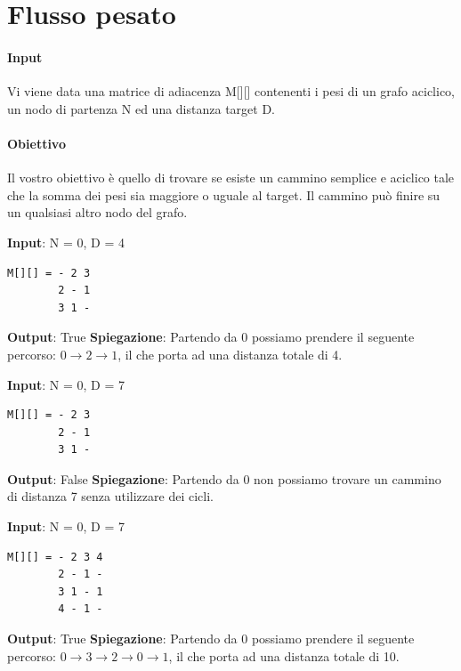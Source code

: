 \setlength{\parskip}{0pt}
\titlespacing*{\subparagraph}{1em}{0em}{0em} 

\thispagestyle{chapterInit}
\section*{Flusso pesato}
    \paragraph{Input} Vi viene data una matrice di adiacenza M[][] contenenti i pesi di un grafo aciclico, un nodo di partenza N ed una distanza target D.
    \paragraph{Obiettivo} Il vostro obiettivo è quello di trovare se esiste un cammino semplice e aciclico tale che la somma dei pesi sia maggiore o uguale al target. Il cammino può finire su un qualsiasi altro nodo del grafo.
        \begin{esempio}
        \newline
        \textbf{Input}: N = 0, D = 4
        \begin{verbatim}
M[][] = - 2 3
        2 - 1
        3 1 -
        \end{verbatim}
        \textbf{Output}: True
        \textbf{Spiegazione}: Partendo da 0 possiamo prendere il seguente percorso: $0 \rightarrow 2 \rightarrow 1$, il che porta ad una distanza totale di 4.
    \end{esempio}
    \begin{esempio}
        \newline
        \textbf{Input}: N = 0, D = 7
        \begin{verbatim}
M[][] = - 2 3
        2 - 1
        3 1 -
        \end{verbatim}
        \textbf{Output}: False
        \textbf{Spiegazione}: Partendo da 0 non possiamo trovare un cammino di distanza 7 senza utilizzare dei cicli.
    \end{esempio}
    \begin{esempio}
        \newline
        \textbf{Input}: N = 0, D = 7
        \begin{verbatim}
M[][] = - 2 3 4
        2 - 1 -
        3 1 - 1
        4 - 1 -
        \end{verbatim}
        \textbf{Output}: True
        \textbf{Spiegazione}: Partendo da 0 possiamo prendere il seguente percorso: $0 \rightarrow 3 \rightarrow 2 \rightarrow 0 \rightarrow 1$, il che porta ad una distanza totale di 10.
    \end{esempio}

